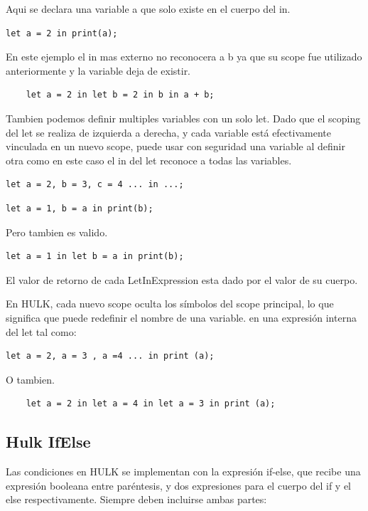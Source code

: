 \documentclass[a4paper, 12pt]{report}
\begin{document}
Aqui se declara una variable a que solo existe en el cuerpo del in.
\begin{lstlisting}
let a = 2 in print(a);
\end{lstlisting}
En este ejemplo el in mas externo no reconocera a b ya que su scope fue utilizado anteriormente y la variable deja de existir.
\begin{lstlisting}
    let a = 2 in let b = 2 in b in a + b;
\end{lstlisting}

Tambien podemos definir multiples variables con un solo let.
Dado que el scoping del let se realiza de izquierda a derecha, y cada
variable está efectivamente vinculada en un nuevo scope, puede usar con seguridad una variable al definir otra como en este caso el in del let reconoce a todas las variables.
\begin{lstlisting}
let a = 2, b = 3, c = 4 ... in ...;
\end{lstlisting}


\begin{lstlisting}
let a = 1, b = a in print(b);
\end{lstlisting}

Pero tambien es valido.
\begin{lstlisting}
let a = 1 in let b = a in print(b);
\end{lstlisting}
El valor de retorno de cada LetInExpression esta dado por el valor de su cuerpo.

En HULK, cada nuevo scope oculta los símbolos del scope principal, lo que significa que puede redefinir el nombre de una variable.
en una expresión interna del let tal como:

\begin{lstlisting}
let a = 2, a = 3 , a =4 ... in print (a);
\end{lstlisting}
O tambien.
\begin{lstlisting}
    let a = 2 in let a = 4 in let a = 3 in print (a);
\end{lstlisting}


\subsection*{Hulk IfElse}

Las condiciones en HULK se implementan con la expresión if-else, que recibe una expresión booleana entre paréntesis, y dos expresiones para el cuerpo del if y el else respectivamente. Siempre deben incluirse ambas partes:
\end{document}
